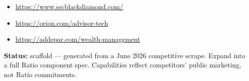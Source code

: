 \footnotesize
\begin{itemize}
  \item \url{https://www.sscblackdiamond.com/}
  \item \url{https://orion.com/advisor-tech}
  \item \url{https://addepar.com/wealth-management}
\end{itemize}

\begin{statusbox}
\textbf{Status:} scaffold --- generated from a June 2026 competitive scrape.
Expand into a full Ratio component spec. Capabilities reflect competitors' public
marketing, not Ratio commitments.
\end{statusbox}

